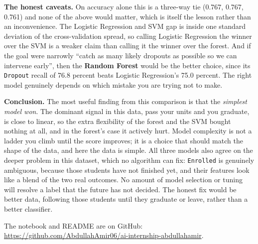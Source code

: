 \documentclass[11pt,a4paper]{article}
\begin{document}
\textbf{The honest caveats.} On accuracy alone this is a three-way tie (0.767, 0.767,
0.761) and none of the above would matter, which is itself the lesson rather than an
inconvenience. The Logistic Regression and SVM gap is inside one standard deviation of
the cross-validation spread, so calling Logistic Regression the winner over the SVM is a
weaker claim than calling it the winner over the forest. And if the goal were narrowly
``catch as many likely dropouts as possible so we can intervene early'', then the
\textbf{Random Forest} would be the better choice, since its \texttt{Dropout} recall of
76.8 percent beats Logistic Regression's 75.0 percent. The right model genuinely depends
on which mistake you are trying not to make.

\textbf{Conclusion.} The most useful finding from this comparison is that the
\emph{simplest model won}. The dominant signal in this data, pass your units and you
graduate, is close to linear, so the extra flexibility of the forest and the SVM bought
nothing at all, and in the forest's case it actively hurt. Model complexity is not a
ladder you climb until the score improves; it is a choice that should match the shape of
the data, and here the data is simple. All three models also agree on the deeper problem
in this dataset, which no algorithm can fix: \texttt{Enrolled} is genuinely ambiguous,
because those students have not finished yet, and their features look like a blend of
the two real outcomes. No amount of model selection or tuning will resolve a label that
the future has not decided. The honest fix would be better data, following those
students until they graduate or leave, rather than a better classifier.

\vspace{0.4cm}
The notebook and README are on GitHub:
\url{https://github.com/AbdullahAmir06/ai-internship-abdullahamir}.
\end{document}
